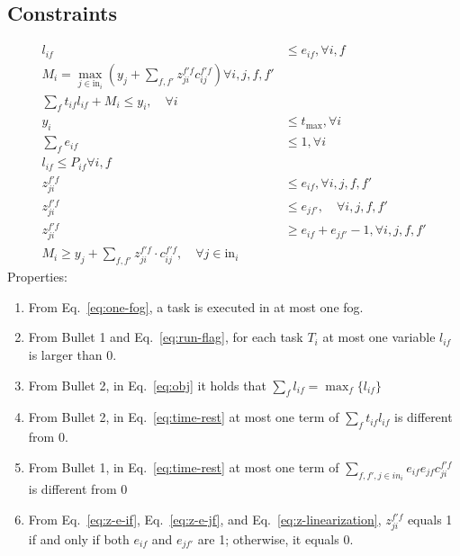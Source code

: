 \documentclass{article}
\begin{document}
\subsection*{Constraints}
\begin{align}
    l_{if} &\leq e_{if}, \forall i, f \label{eq:run-flag} \\ 
    M_i = \max_{j \in \text{in}_i} \left( y_j + \sum_{f, f'} z_{ji}^{f'f}  c_{ij}^{f'f} \right) \forall i, j, f, f'\\
    \sum_f t_{if} l_{if} + M_i \leq y_i, \quad \forall i \label{eq:time-rest} \\
    y_i &\leq t_{\max}, \forall i \\
    \sum_f e_{if} & \leq 1, \forall i \label{eq:one-fog} \\
    l_{if} \leq P_{if} \forall i,f \\
    z_{ji}^{f'f} &\leq e_{if}, \forall i, j, f, f' \label{eq:z-e-if} \\
    z_{ji}^{f'f} &\leq e_{jf'}, \quad \forall i, j, f, f' \label{eq:z-e-jf} \\
    z_{ji}^{f'f} &\geq e_{if} + e_{jf'} - 1, \forall i, j, f, f' \label{eq:z-linearization}\\
    M_i \geq y_j + \sum_{f, f'} z_{ji}^{f'f} \cdot c_{ij}^{f'f}, \quad \forall j \in \text{in}_i
\end{align}
Properties:
\begin{enumerate}
    \item From Eq.~\ref{eq:one-fog}, a task is executed in at most one fog.
    \item From Bullet 1 and Eq.~\ref{eq:run-flag}, for each task $T_i$ at most one variable $l_{if}$ is larger than 0.
    \item From Bullet 2, in Eq.~\ref{eq:obj} it holds that $\sum_f l_{if} = \max_f \{l_{if}\}$
    \item From Bullet 2, in Eq.~\ref{eq:time-rest} at most one term of $\sum_f t_{if} l_{if}$ is different from 0.
    \item From Bullet 1, in Eq.~\ref{eq:time-rest} at most one term of $\sum_{f,f',j \in in_i} e_{if} e_{jf}  c_{ji}^{f'f}$ is different from 0 
    \item From Eq.~\ref{eq:z-e-if}, Eq.~\ref{eq:z-e-jf}, and Eq.~\ref{eq:z-linearization}, \( z_{ji}^{f'f} \) equals 1 if and only if both \( e_{if} \) and \( e_{jf'} \) are 1; otherwise, it equals 0.
\end{enumerate}
\end{document}

